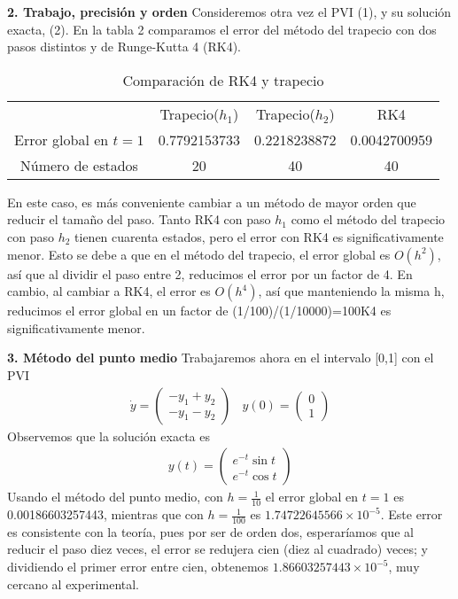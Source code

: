 \documentclass[11pt]{article}
\begin{document}
$ $\\ 

\noindent
\textbf{2. Trabajo, precisión y orden}
\newline
Consideremos otra vez el PVI (1), y su solución exacta, (2). En la tabla 2 comparamos
el error del método del trapecio con dos pasos distintos y de Runge-Kutta 4 (RK4). 

\begin{table}[h]
\caption{Comparación de RK4 y trapecio}
\centering
\begin{tabular}{cccc}
\hline \hline
$ $ & Trapecio($h_1$) & Trapecio($h_2$) & RK4 \\
Error global en $t=1$ & 0.7792153733  &  0.2218238872 & 0.0042700959 \\
Número de estados  &     20       &       40       &       40 \\
\hline
\end{tabular}
\end{table}
En este caso, es más conveniente cambiar a un método de mayor orden que reducir el
tamaño del paso. Tanto RK4 con paso $h_1$ como el método del trapecio con paso 
$h_2$ tienen cuarenta estados, pero el error con RK4 es significativamente menor.
Esto se debe a que en el método del trapecio, el error global es $O(h^2)$, así que al 
dividir el paso entre 2, reducimos el error por un factor de 4. En cambio, al 
cambiar a RK4, el error es $O(h^4)$, así que manteniendo  la misma h, reducimos el 
error global en un factor de (1/100)/(1/10000)=100K4 es significativamente menor.

$ $\\ 

\noindent
\textbf{3. Método del punto medio}
\newline
Trabajaremos ahora en el intervalo [0,1] con el PVI 
\begin{align*}
\dot{y} = \begin{pmatrix}
-y_1+y_2 \\
-y_1-y_2
\end{pmatrix}
\ \ \ \ y(0) = \begin{pmatrix}
0  \\ 1
\end{pmatrix}
\end{align*}
Observemos que la solución exacta es 
\begin{align*}
y(t) = \begin{pmatrix}
e^{-t}\sin t\\
e^{-t} \cos t
\end{pmatrix}
\end{align*}
Usando el método del punto medio, con $h = \frac{1}{10}$ el error global en $t=1$ es  
0.00186603257443, mientras que con $h = \frac{1}{100}$ es $1.74722645566\times 	
10^{-5}.$ Este error es consistente con la teoría, pues por ser de orden dos,
esperaríamos que al reducir el paso diez veces, el error se redujera cien (diez al 
cuadrado) veces; y dividiendo el primer error entre cien, obtenemos $1.86603257443
\times 10^{-5}$, muy cercano al experimental.
\end{document}

